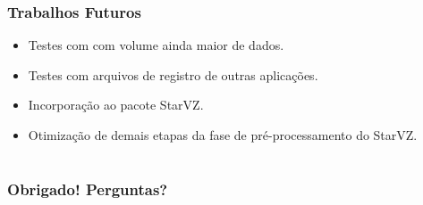 \documentclass{beamer}
\begin{document}
\begin{frame}
 \frametitle{Trabalhos Futuros}
 \begin{itemize}
  \item Testes com com volume ainda maior de dados.
  \item Testes com arquivos de registro de outras aplicações.
  \item Incorporação ao pacote StarVZ.
  \item Otimização de demais etapas da fase de pré-processamento do StarVZ.
 \end{itemize}
\end{frame}


\section*{}
\begin{frame}
    \frametitle{Obrigado! Perguntas?}
    \InfContacts
\end{frame}
\end{document}
